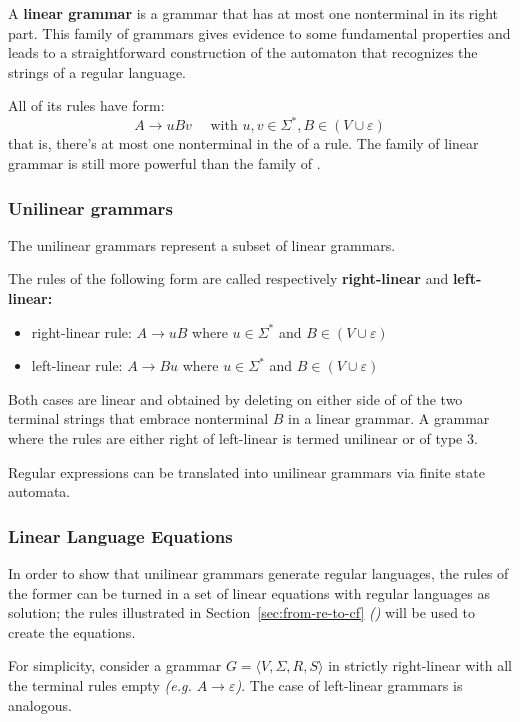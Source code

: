 \documentclass[english]{article}
\begin{document}
A \textbf{linear grammar} is a \CF grammar that has at most one nonterminal in its right part.
This family of grammars gives evidence to some fundamental properties and leads to a straightforward construction of the automaton that recognizes the strings of a regular language.

All of its rules have form:
\[A \rightarrow uBv \quad \text{ with } u, v \in \Sigma^\ast, B \in \left(V \cup \varepsilon\right) \]
that is, there's at most one nonterminal in the \RP of a rule.
The family of linear grammar is still more powerful than the family of \RE.

\subsubsection{Unilinear grammars}

The unilinear grammars represent a subset of linear grammars.

The rules of the following form are called respectively \textbf{right-linear} and \textbf{left-linear:}

\begin{itemize}
  \item right-linear rule: \(A \rightarrow uB \) where \(u \in \Sigma^\ast\) and \(B \in \left( V \cup \varepsilon \right)\)
  \item left-linear rule: \(A \rightarrow Bu \) where \(u \in \Sigma^\ast\) and \(B \in \left( V \cup \varepsilon \right)\)
\end{itemize}

Both cases are linear and obtained by deleting on either side of of the two terminal strings that embrace nonterminal \(B\) in a linear grammar.
A grammar where the rules are either right of left-linear is termed unilinear or of type 3.

Regular expressions can be translated into unilinear grammars via finite state automata.

\subsubsection{Linear Language Equations}

In order to show that unilinear grammars generate regular languages, the rules of the former can be turned in a set of linear equations with regular languages as solution;
the rules illustrated in Section~\ref{sec:from-re-to-cf} \textit{()} will be used to create the equations.

For simplicity, consider a grammar \(G = \langle V, \Sigma, R, S \rangle\) in strictly right-linear with all the terminal rules empty \textit{(e.g. \(A \rightarrow \varepsilon\))}.
The case of left-linear grammars is analogous.
\end{document}
